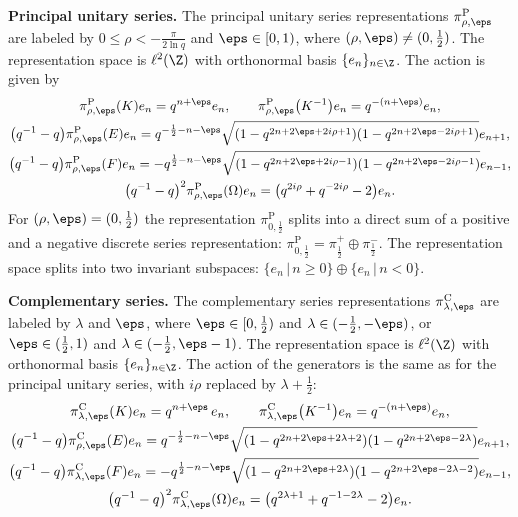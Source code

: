 \textbf{Principal unitary series.} The principal unitary series
representations $\pi^{\mathrm P}_{\rho,\eps}$ are labeled by $0\leq\rho <
-\frac{\pi}{2\ln q}$ and $\eps \in [0,1)$, where $(\rho,\eps)
\neq (0,\frac12)$. The representation space is $\ell^2(\Z)$ with
orthonormal basis $\{e_n\}_{n \in \Z}$. The action is given by
\begin{gather}
\pi^{\mathrm P}_{\rho,\eps}(K) e_n = q^{n+\eps} e_n, \qquad
\pi^{\mathrm P}_{\rho,\eps} \big(K^{-1}\big) e_n = q^{-(n+\eps)}e_n,\nonumber\\
\big(q^{-1}-q\big)\pi^{\mathrm P}_{\rho,\eps}(E) e_n = q^{-\frac12-n-\eps} \sqrt{(1-q^{2n+2\eps+2i\rho+1})
(1-q^{2n+2\eps-2i\rho+1})} e_{n+1},
\nonumber\\
\big(q^{-1}-q\big)\pi^{\mathrm P}_{\rho,\eps}(F) e_n = -q^{\frac12-n-\eps}
\sqrt{(1-q^{2n+2\eps+2i\rho-1}) (1-q^{2n+2\eps-2i\rho-1})} e_{n-1},
\nonumber\\
\big(q^{-1}-q\big)^2 \pi^{\mathrm P}_{\rho,\eps} (\Omega) e_n
=\big(q^{2i\rho}+q^{-2i\rho} -2\big) e_n.\label{eq:princ}
\end{gather}
For $(\rho,\eps)= (0,\frac12)$ the representation $\pi^{\mathrm P}_{0,\frac12}$ splits into a direct
sum of a positive and a negative discrete series representation: $\pi^{\mathrm P}_{0,\frac12}= \pi^+_\frac12
\oplus \pi^-_\frac12$. The representation space splits into two invariant subspaces: $\{ e_n\, | \, n \geq 0 \} \oplus \{e_n \, |\,
n<0 \}$.

\textbf{Complementary series.} The complementary series
representations $\pi^{\mathrm C}_{\lambda,\eps}$ are labeled by $\lambda$ and
$\eps$, where $\eps \in [0,\frac12)$ and $\lambda \in (-\frac12,-\eps)$, or
$\eps \in (\frac12,1)$ and $\lambda \in (-\frac12, \eps-1)$. The
representation space is $\ell^2(\Z)$ with orthonormal basis
$\{e_n\}_{n \in \Z}$. The action of the generators is the same as for the principal unitary series, with $i\rho$ replaced by $\lambda+\frac12$:
\begin{gather}
\pi^{\mathrm C}_{\lambda,\eps}(K) e_n = q^{n+\eps}\, e_n, \qquad
\pi^{\mathrm C}_{\lambda,\eps} \big(K^{-1}\big) e_n = q^{-(n+\eps)}e_n,\nonumber\\
\big(q^{-1}-q\big)\pi^{\mathrm C}_{\rho,\eps}(E) e_n
= q^{-\frac12-n-\eps} \sqrt{(1-q^{2n+2\eps+2\lambda+2})
(1-q^{2n+2\eps-2\lambda})} e_{n+1},
\nonumber\\
\big(q^{-1}-q\big)\pi^{\mathrm C}_{\lambda,\eps}(F) e_n = -q^{\frac12-n-\eps}
\sqrt{(1-q^{2n+2\eps+2\lambda}) (1-q^{2n+2\eps-2\lambda-2})} e_{n-1},\nonumber\\
\big(q^{-1}-q\big)^2 \pi^{\mathrm C}_{\lambda,\eps} (\Omega) e_n
=\big(q^{2\lambda+1}+q^{-1-2\lambda} -2\big) e_n.\label{eq:comp}
\end{gather}


